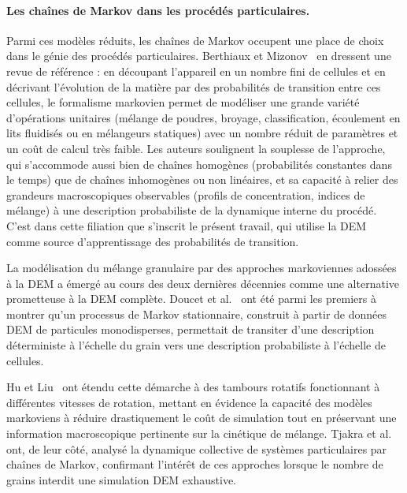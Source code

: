 \documentclass[french]{MemoireMaster}
\begin{document}
\paragraph{Les chaînes de Markov dans les procédés particulaires.} Parmi ces modèles réduits, les chaînes de Markov occupent une place de choix dans le génie des procédés particulaires. Berthiaux et Mizonov~\cite{berthiaux2004} en dressent une revue de référence : en découpant l'appareil en un nombre fini de cellules et en décrivant l'évolution de la matière par des probabilités de transition entre ces cellules, le formalisme markovien permet de modéliser une grande variété d'opérations unitaires (mélange de poudres, broyage, classification, écoulement en lits fluidisés ou en mélangeurs statiques) avec un nombre réduit de paramètres et un coût de calcul très faible. Les auteurs soulignent la souplesse de l'approche, qui s'accommode aussi bien de chaînes homogènes (probabilités constantes dans le temps) que de chaînes inhomogènes ou non linéaires, et sa capacité à relier des grandeurs macroscopiques observables (profils de concentration, indices de mélange) à une description probabiliste de la dynamique interne du procédé. C'est dans cette filiation que s'inscrit le présent travail, qui utilise la DEM comme source d'apprentissage des probabilités de transition.

La modélisation du mélange granulaire par des approches markoviennes adossées à la DEM a émergé au cours des deux dernières décennies comme une alternative prometteuse à la DEM complète. Doucet et al.~\cite{doucet2008} ont été parmi les premiers à montrer qu'un processus de Markov stationnaire, construit à partir de données DEM de particules monodisperses, permettait de transiter d'une description déterministe à l'échelle du grain vers une description probabiliste à l'échelle de cellules.

Hu et Liu~\cite{hu2021} ont étendu cette démarche à des tambours rotatifs fonctionnant à différentes vitesses de rotation, mettant en évidence la capacité des modèles markoviens à réduire drastiquement le coût de simulation tout en préservant une information macroscopique pertinente sur la cinétique de mélange. Tjakra et al.~\cite{tjakra2013} ont, de leur côté, analysé la dynamique collective de systèmes particulaires par chaînes de Markov, confirmant l'intérêt de ces approches lorsque le nombre de grains interdit une simulation DEM exhaustive.
\end{document}
